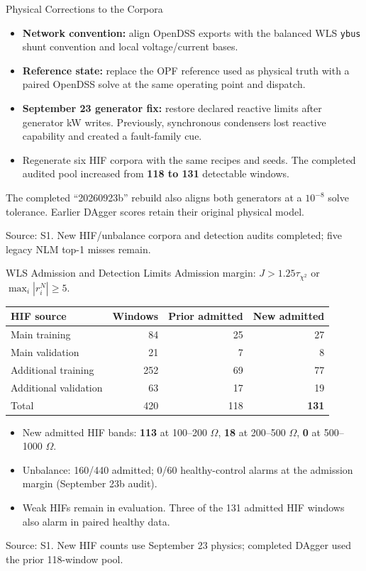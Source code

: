 \documentclass{beamer}
\newcommand{\src}[1]{\par\vfill\begin{minipage}{0.67\textwidth}\tiny\color{gray}Source: #1.\end{minipage}\par}
\begin{document}
\begin{frame}{Physical Corrections to the Corpora}
  \begin{itemize}
    \setlength\itemsep{0.55em}
    \item \textbf{Network convention:} align OpenDSS exports with the balanced WLS \texttt{ybus} shunt convention and local voltage/current bases.
    \item \textbf{Reference state:} replace the OPF reference used as physical truth with a paired OpenDSS solve at the same operating point and dispatch.
    \item \textbf{September 23 generator fix:} restore declared reactive limits after generator kW writes. Previously, synchronous condensers lost reactive capability and created a fault-family cue.
    \item Regenerate six HIF corpora with the same recipes and seeds. The completed audited pool increased from \textbf{118 to 131} detectable windows.
  \end{itemize}
  \small The completed ``20260923b'' rebuild also aligns both generators at a $10^{-8}$ solve tolerance. Earlier DAgger scores retain their original physical model.
  \src{S1. New HIF/unbalance corpora and detection audits completed; five legacy NLM top-1 misses remain}
\end{frame}

\begin{frame}{WLS Admission and Detection Limits}
  \small
  Admission margin: $J>1.25\tau_{\chi^2}$ or $\max_i|r_i^N|\geq5$.
  \begin{center}
    \renewcommand{\arraystretch}{1.15}
    \begin{tabular}{lrrr}
      \toprule
      HIF source & Windows & Prior admitted & New admitted \\
      \midrule
      Main training & 84 & 25 & 27 \\
      Main validation & 21 & 7 & 8 \\
      Additional training & 252 & 69 & 77 \\
      Additional validation & 63 & 17 & 19 \\
      \midrule
      Total & 420 & 118 & \textbf{131} \\
      \bottomrule
    \end{tabular}
  \end{center}
  \begin{itemize}
    \item New admitted HIF bands: \textbf{113} at 100--200 $\Omega$, \textbf{18} at 200--500 $\Omega$, \textbf{0} at 500--1000 $\Omega$.
    \item Unbalance: 160/440 admitted; 0/60 healthy-control alarms at the admission margin (September 23b audit).
    \item Weak HIFs remain in evaluation. Three of the 131 admitted HIF windows also alarm in paired healthy data.
  \end{itemize}
  \src{S1. New HIF counts use September 23 physics; completed DAgger used the prior 118-window pool}
\end{frame}
\end{document}
